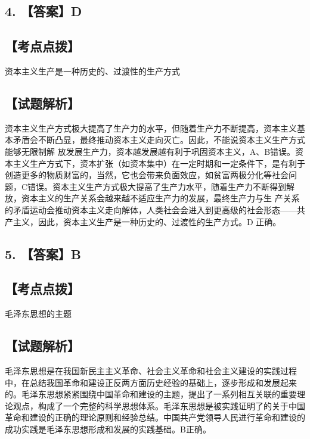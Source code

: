 \documentclass[UTF8,11pt]{ctexart}
\begin{document}
\subsection*{4. 【答案】D}

\subsection*{【考点点拨】}

资本主义生产是一种历史的、过渡性的生产方式


\subsection*{【试题解析】}

资本主义生产方式极大提高了生产力的水平，但随着生产力不断提高，资本主义基 本矛盾会不断凸显，最终推动资本主义走向灭亡。因此，不能说资本主义生产方式能够无限制解 放发展生产力，资本越发展越有利于巩固资本主义，A、B错误。资本主义生产方式下，资本扩张（如资本集中）在一定时期和一定条件下，是有利于创造更多的物质财富的，当然，它也会带来负面效应，如贫富两极分化等社会问题，C错误。资本主义生产方式极大提高了生产力水平，随着生产力不断得到解放，资本主义的生产关系会越来越不适应生产力的发展，最终生产力与生 产关系的矛盾运动会推动资本主义走向解体，人类社会会进入到更高级的社会形态——共产主义，因此，资本主义生产是一种历史的、过渡性的生产方式。D 正确。


\subsection*{5. 【答案】B}

\subsection*{【考点点拨】}

毛泽东思想的主题


\subsection*{【试题解析】}

毛泽东思想是在我国新民主主义革命、社会主义革命和社会主义建设的实践过程中，在总结我国革命和建设正反两方面历史经验的基础上，逐步形成和发展起来的。毛泽东思想紧紧围绕中国革命和建设的主题，提出了一系列相互关联的重要理论观点，构成了一个完整的科学思想体系。毛泽东思想是被实践证明了的关于中国革命和建设的正确的理论原则和经验总结。中国共产党领导人民进行革命和建设的成功实践是毛泽东思想形成和发展的实践基础。B正确。
\end{document}
